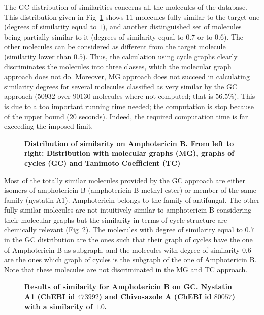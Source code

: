 \documentclass[10pt,letterpaper]{article}
\begin{document}
The GC distribution of similarities concerns all the molecules of the database. This distribution given in Fig~\ref{fig13} shows $11$ molecules fully similar to the target one (degrees of similarity equal to $1$), and another distinguished set of molecules being partially similar to it (degrees of similarity equal to $0.7$ or to $0.6$). The other molecules can be considered as different from the target molecule (similarity lower than $0.5$). Thus, the calculation using cycle graphs clearly discriminates the molecules into three classes, which the molecular graph approach does not do. Moreover, MG approach does not succeed in calculating similarity degrees for several molecules classified as very similar by the GC approach ($50932$ over $90130$ molecules where not computed; that is $56.5 \%$). This is due to a too important running time needed; the computation is stop because of the upper bound ($20$ seconds). Indeed, the required computation time is far exceeding the imposed limit.  

\begin{figure}[!h]
	\caption{\bf{Distribution of similarity on Amphotericin B.}
	From left to right: Distribution with molecular graphs (MG), graphs of cycles (GC) and Tanimoto Coefficient (TC)}
	\label{fig13}
\end{figure}
 
 Most of the totally similar molecules provided by the GC approach are either isomers of amphotericin B (amphotericin B methyl ester) or member of the same family (nystatin A1). Amphotericin belongs to the family of antifungal. The other fully similar molecules are not intuitively similar to amphotericin B considering their molecular graphs but the similarity in terms of cycle structure are chemically relevant 
 (Fig~\ref{fig14}). The molecules with degree of similarity equal to $0.7$ in the GC distribution are the ones  such that their graph of cycles have the one of Amphotericin B as subgraph, and the molecules with degree of similarity $0.6$ are the ones which graph of cycles is the subgraph of the one of Amphotericin B. Note that these molecules are not discriminated in the MG and TC approach.

 \begin{figure}[!h]
	\caption{\bf{Results of similarity for Amphotericin B on GC.} 
	Nystatin A1 (ChEBI id $ 473992$) and Chivosazole A (ChEBI id $80057$) with a similarity of $1.0$. }
	\label{fig14}
\end{figure}
\end{document}
